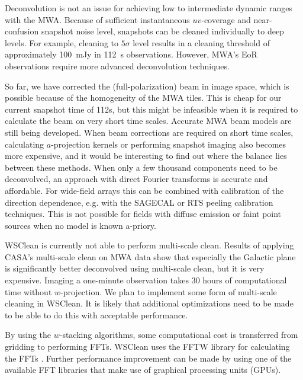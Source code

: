 \documentclass[useAMS,usenatbib]{mn2e}
\begin{document}
Deconvolution is not an issue for achieving low to intermediate dynamic ranges with the MWA. Because of sufficient instantaneous $uv$-coverage and near-confusion snapshot noise level, snapshots can be cleaned individually to deep levels. For example, cleaning to $5\sigma$ level results in a cleaning threshold of approximately 100~mJy in 112~s observations. However, MWA's EoR observations \citep{bowman-science-with-the-mwa-2013} require more advanced deconvolution techniques.

So far, we have corrected the (full-polarization) beam in image space, which is possible because of the homogeneity of the MWA tiles. This is cheap for our current snapshot time of 112s, but this might be infeasible when it is required to calculate the beam on very short time scales. Accurate MWA beam models are still being developed. When beam corrections are required on short time scales, calculating $a$-projection kernels or performing snapshot imaging also becomes more expensive, and it would be interesting to find out where the balance lies between these methods. When only a few thousand components need to be deconvolved, an approach with direct Fourier transforms is accurate and affordable. For wide-field arrays this can be combined with calibration of the direction dependence, e.g. with the SAGECAL \citep{sage-calibration-ii} or RTS peeling \citep{rts-mwa} calibration techniques. This is not possible for fields with diffuse emission or faint point sources when no model is known a-priory.

WSClean is currently not able to perform multi-scale clean. Results of applying CASA's multi-scale clean on MWA data show that especially the Galactic plane is significantly better deconvolved using multi-scale clean, but it is very expensive. Imaging a one-minute observation takes 30 hours of computational time without $w$-projection. We plan to implement some form of multi-scale cleaning in WSClean. It is likely that additional optimizations need to be made to be able to do this with acceptable performance.

By using the $w$-stacking algorithms, some computational cost is transferred from gridding to performing FFTs. WSClean uses the FFTW library for calculating the FFTs \citep{fftw-2005}. Further performance improvement can be made by using one of the available FFT libraries that make use of graphical processing units (GPUs).
\end{document}
